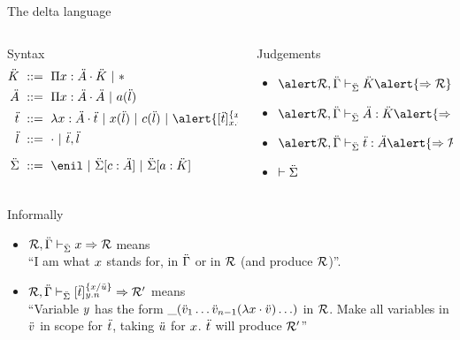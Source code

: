 \documentclass[ignorenonframetext,red]{beamer}
\begin{document}
\begin{frame}{The delta language}
  \inXLF
  \begin{columns}
    \begin{column}{0.6\textwidth}
      \begin{block}{Syntax} \vspace{-2em}
        \begin{align*}
          \mk &\gequal { \prd\mv\mf\mk \gor \type } \\
          \mf &\gequal { \prd\mv\mf\mf \gor \lapp\mcf\ma } \\
          \mo &\gequal { \lam\mv\mf\mo \gor \lapp\mv\ma \gor \lapp\mco\ma
            \gor \alert{\ibox\mo{\mv.n}\mv\mo}
          } \\
        \ma &\gequal { \lnil \gor \lcons\mo\ma} \\[0.5em]
          \msi &\gequal { \enil \gor \ebinddecl\msi\mco\mf \gor
            \ebinddecl\msi\mcf\mk }
        \end{align*}
      \end{block}
    \end{column}
    \begin{column}{0.4\textwidth}
      \begin{block}{Judgements}
        \begin{itemize}
        \item $\jindex\msi{\pair{\alert\mr}\me}\mk\alert{\To\mr}$
        \item $\jindex\msi{\pair{\alert\mr}\me}{\typ\mf\mk}\alert{\To\mr}$
        \item $\jindex\msi{\pair{\alert\mr}\me}{\typ\mo\mf}\alert{\To\mr}$
        \item $\vdash\ddot{\Sigma}$
        \end{itemize}
      \end{block}
    \end{column}
  \end{columns}
  \begin{block}{Informally}
    \begin{itemize}
    \item ${{\mathcal{R}},{\ddot{\Gamma}}}\vdash_{\ddot{\Sigma}}{x}\Rightarrow\mathcal{R}$ {\footnotesize
        means}\\ “I am what $x$ stands for, in $\ddot{\Gamma}$ or in $\mathcal{R}$ (and produce $\mathcal{R}$)”.
    \item ${{\mathcal{R}},{\ddot{\Gamma}}}\vdash_{\ddot{\Sigma}}{[\ddot{t}]_{y.n}^{{}\{{x}/{\ddot{u}}\}}}\Rightarrow\mathcal{R'}$
      {\footnotesize means}\\ “Variable $y$ has the form
      ${\_}({\ddot{v}_1\ldots\ddot{v}_{n-1}(\lambda{x}\cdot \ddot{v})\ldots})$ in $\mathcal{R}$. Make all
      variables in $\ddot{v}$ in scope for $\ddot{t}$, taking
      $\ddot{u}$ for $x$. $\ddot{t}$ will produce $\mathcal{R'}$”
    \end{itemize}
  \end{block}
\end{frame}
\end{document}
